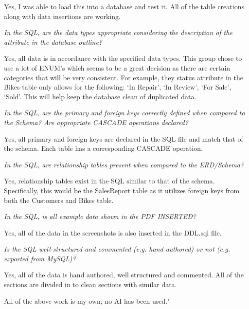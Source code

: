 \documentclass{article}
\begin{document}
\begin{tcolorbox}[colback=secondarycolor, colframe=primarycolor, title=\textbf{Step 2: Peer Review 1 - Joseph Gilmore}]
\vspace{0.05cm}
Yes, I was able to load this into a database and test it. All of the table creations along with data insertions are working.

\vspace{0.2cm}
\textit{In the SQL, are the data types appropriate considering the description of the attribute in the database outline?}

\vspace{0.05cm}
Yes, all data is in accordance with the specified data types. This group chose to use a lot of ENUM's which seems to be a great decision as there are certain categories that will be very consistent. For example, they status attribute in the Bikes table only allows for the following: `In Repair', `In Review', `For Sale', `Sold'. This will help keep the database clean of duplicated data.

\vspace{0.2cm}
\textit{In the SQL, are the primary and foreign keys correctly defined when compared to the Schema? Are appropriate CASCADE operations declared?}

\vspace{0.05cm}
Yes, all primary and foreign keys are declared in the SQL file and match that of the schema. Each table has a corresponding CASCADE operation. 

\vspace{0.2cm}
\textit{In the SQL, are relationship tables present when compared to the ERD/Schema?}

\vspace{0.05cm}
Yes, relationship tables exist in the SQL similar to that of the schema. Specifically, this would be the SalesReport table as it utilizes foreign keys from both the Customers and Bikes table.

\vspace{0.2cm}
\textit{In the SQL, is all example data shown in the PDF INSERTED?}

\vspace{0.05cm}
Yes, all of the data in the screenshots is also inserted in the DDL.sql file.

\vspace{0.2cm}
\textit{Is the SQL well-structured and commented (e.g. hand authored) or not (e.g. exported from MySQL)?}

\vspace{0.05cm}
Yes, all of the data is hand authored, well structured and commented. All of the sections are divided in to clean sections with similar data.
 
\vspace{0.2cm}
All of the above work is my own; no AI has been used."

\end{tcolorbox}
\end{document}
